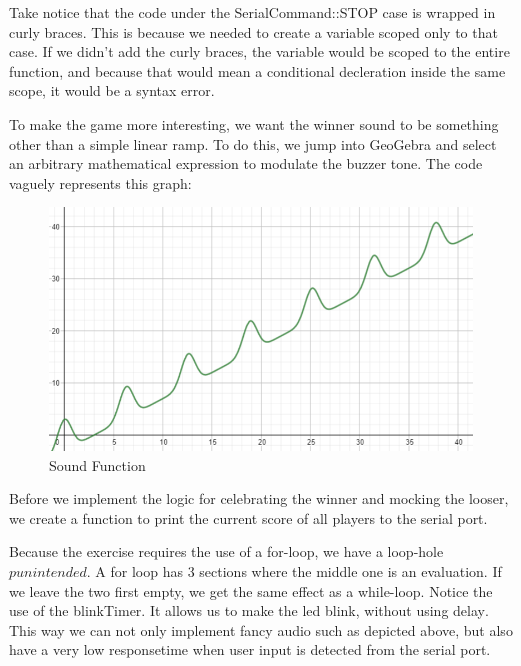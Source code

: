 \documentclass[journal]{IEEEtran}
\begin{document}
Take notice that the code under the SerialCommand::STOP case is wrapped in curly braces.
This is because we needed to create a variable scoped only to that case. If we didn't add
the curly braces, the variable would be scoped to the entire function, and because that
would mean a conditional decleration inside the same scope, it would be a syntax error.


To make the game more interesting, we want the winner sound to be something other than a simple
linear ramp. To do this, we jump into GeoGebra and select an arbitrary mathematical expression
to modulate the buzzer tone. The code vaguely represents this graph:

\begin{figure}[H]%
    \begin {center}
    \includegraphics[width=\textwidth]{images/sound-function.PNG}
    \caption{Sound Function}
    \label{fig:sound-function}
    \end {center}
\end{figure}


Before we implement the logic for celebrating the winner and mocking the looser, we create a function to print
the current score of all players to the serial port.


Because the exercise requires the use of a for-loop, we have a loop-hole \(pun intended\). A for loop has 3 sections
where the middle one is an evaluation. If we leave the two first empty, we get the same effect as a while-loop.
Notice the use of the blinkTimer. It allows us to make the led blink, without using delay\(\). This way we
can not only implement fancy audio such as depicted above, but also have a very low responsetime when user input
is detected from the serial port.
\end{document}

